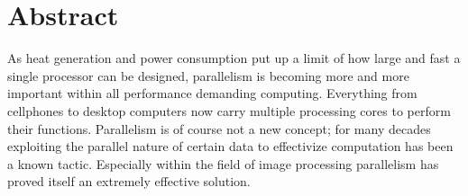 \begingroup
\let\clearpage\relax
\let\cleardoublepage\relax
\let\cleardoublepage\relax

\chapter*{Abstract}




As heat generation and power consumption put up a limit of how large and fast a
single processor can be designed, parallelism is becoming more and more
important within all performance demanding computing. Everything from cellphones
to desktop computers now carry multiple processing cores to perform their
functions. Parallelism is of course not a new concept; for many decades
exploiting the parallel nature of certain data to effectivize computation has
been a known tactic. Especially within the field of image processing parallelism
has proved itself an extremely effective solution.

